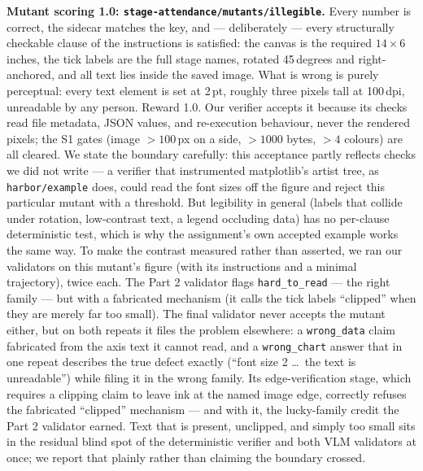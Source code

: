 \documentclass[11pt]{article}
\begin{document}
\textbf{Mutant scoring 1.0: \texttt{stage-attendance/mutants/illegible}.}
Every number is correct, the sidecar matches the key, and --- deliberately
--- every structurally checkable clause of the instructions is satisfied:
the canvas is the required $14\times6$ inches, the tick labels are the full
stage names, rotated 45\,degrees and right-anchored, and all text lies
inside the saved image. What is wrong is purely perceptual: every text
element is set at 2\,pt, roughly three pixels tall at 100\,dpi, unreadable
by any person. Reward 1.0. Our verifier accepts it because its checks read
file metadata, JSON values, and re-execution behaviour, never the rendered
pixels; the S1 gates (image $>100$\,px on a side, $>1000$ bytes, $>4$
colours) are all cleared. We state the boundary carefully: this acceptance
partly reflects checks we did not write --- a verifier that instrumented
matplotlib's artist tree, as \texttt{harbor/example} does, could read the
font sizes off the figure and reject this particular mutant with a
threshold. But legibility in general (labels that collide under rotation,
low-contrast text, a legend occluding data) has no per-clause deterministic
test, which is why the assignment's own accepted example works the same
way. To make the contrast measured rather than asserted, we ran our
validators on this mutant's figure (with its instructions and a minimal
trajectory), twice each. The Part 2 validator flags
\texttt{hard\_to\_read} --- the right family --- but with a fabricated
mechanism (it calls the tick labels ``clipped'' when they are merely far
too small). The final validator never accepts the mutant either, but on
both repeats it files the problem elsewhere: a \texttt{wrong\_data} claim
fabricated from the axis text it cannot read, and a \texttt{wrong\_chart}
answer that in one repeat describes the true defect exactly (``font size
2 \ldots\ the text is unreadable'') while filing it in the wrong family.
Its edge-verification stage, which requires a clipping claim to leave ink
at the named image edge, correctly refuses the fabricated ``clipped''
mechanism --- and with it, the lucky-family credit the Part 2 validator
earned. Text that is present, unclipped, and simply too small sits in the
residual blind spot of the deterministic verifier and both VLM validators
at once; we report that plainly rather than claiming the boundary
crossed.
\end{document}
